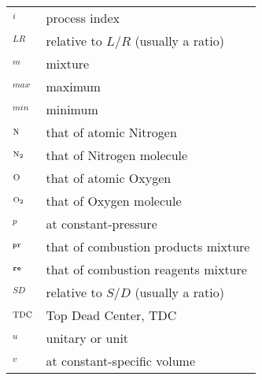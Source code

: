 \begin{supertabular}{@{}p{\lensymb}@{}p{\lenWHAT}}
    ${}_i$                                  & process index                                                                 \\
    ${}_{LR}$                               & relative to $L/R$ (usually a ratio)                                           \\
    ${}_m$                                  & mixture                                                                       \\
    ${}_{max}$                              & maximum                                                                       \\
    ${}_{min}$                              & minimum                                                                       \\
    ${}_{\mbox{\scriptsize \ce{N}}}$        & that of atomic Nitrogen                                                       \\
    ${}_{\mbox{\scriptsize \ce{N2}}}$       & that of Nitrogen molecule                                                     \\
    ${}_{\mbox{\scriptsize \ce{O}}}$        & that of atomic Oxygen                                                         \\
    ${}_{\mbox{\scriptsize \ce{O2}}}$       & that of Oxygen molecule                                                       \\
    ${}_p$                                  & at constant-pressure                                                          \\
    ${}_{\mbox{\scriptsize\tt pr}}$         & that of combustion products mixture                                           \\
    ${}_{\mbox{\scriptsize\tt re}}$         & that of combustion reagents mixture                                           \\
    ${}_{SD}$                               & relative to $S/D$ (usually a ratio)                                           \\
    ${}_{{\mbox{\scriptsize TDC}}}$                             & Top Dead Center, TDC                                                          \\
    ${}_u$                                  & unitary or unit                                                               \\
    ${}_v$                                  & at constant-specific volume                                                   \\
\end{supertabular}
                                                                                                                      
